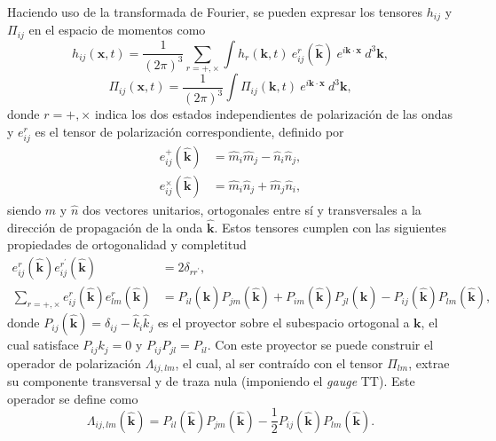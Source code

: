 Haciendo uso de la transformada de Fourier, se pueden expresar los tensores $h_{ij}$ y $\Pi_{ij}$ en el espacio de momentos como
\begin{equation}\label{eqn:ondas+polarizaciones}
    h_{ij} \left( \textbf{x}, t \right) = \frac{1}{(2\pi)^3} \sum_{r = +, \times} \int h_r \left( \textbf{k}, t \right) ~ e^r_{ij} \left( \hat{\textbf{k}} \right) ~ e^{i \textbf{k} \cdot \textbf{x}} ~ d^3 \textbf{k},
\end{equation}
\begin{equation}
    \Pi_{ij} \left( \textbf{x}, t \right) = \frac{1}{(2\pi)^3} \int \Pi_{ij} \left( \textbf{k}, t \right) ~ e^{i \textbf{k} \cdot \textbf{x}} ~ d^3 \textbf{k},
\end{equation}
donde $r = +, \times$ indica los dos estados independientes de polarización de las ondas y $e_{ij}^r$ es el tensor de polarización correspondiente, definido por
\begin{equation}
    \begin{aligned}
        e_{ij}^+ \left( \hat{\textbf{k}} \right) &= \hat{m}_i \hat{m}_j - \hat{n}_i \hat{n}_j, \\
        e_{ij}^\times \left( \hat{\textbf{k}} \right) &= \hat{m}_i \hat{n}_j + \hat{m}_j \hat{n}_i,
    \end{aligned}
\end{equation} 
siendo $\hat{m}$ y $\hat{n}$ dos vectores unitarios, ortogonales entre sí y transversales a la dirección de propagación de la onda $\hat{\textbf{k}}$. Estos tensores cumplen con las siguientes propiedades de ortogonalidad y completitud
\begin{equation}
    \begin{aligned}
        e_{ij}^r \left( \hat{\textbf{k}} \right) e_{ij}^{r^\prime} \left( \hat{\textbf{k}} \right) &= 2 \delta_{rr^\prime}, \\
        \sum_{r = +, \times} e_{ij}^r \left( \hat{\textbf{k}} \right) e_{lm}^r \left( \hat{\textbf{k}} \right) &= P_{il} \left( \hat{\textbf{k}} \right) P_{jm} \left( \hat{\textbf{k}} \right) + P_{im} \left( \hat{\textbf{k}} \right) P_{jl} \left( \hat{\textbf{k}} \right) - P_{ij} \left( \hat{\textbf{k}} \right) P_{lm} \left( \hat{\textbf{k}} \right),
    \end{aligned}
\end{equation}
donde $P_{ij} \left( \hat{\textbf{k}} \right) =  \delta_{ij} - \hat{k}_i \hat{k}_j$ es el proyector sobre el subespacio ortogonal a $\textbf{k}$, el cual satisface $P_{ij} k_j = 0$ y $P_{ij} P_{jl} = P_{il}$. Con este proyector se puede construir el operador de polarización $\Lambda_{ij,lm}$, el cual, al ser contraído con el tensor $\Pi_{lm}$, extrae su componente transversal y de traza nula (imponiendo el \textit{gauge} TT). Este operador se define como
\begin{equation}
    \Lambda_{ij,lm} \left( \hat{\textbf{k}} \right) = P_{il} \left( \hat{\textbf{k}} \right) P_{jm} \left( \hat{\textbf{k}} \right) - \frac{1}{2} P_{ij} \left( \hat{\textbf{k}} \right) P_{lm} \left( \hat{\textbf{k}} \right).
\end{equation}

